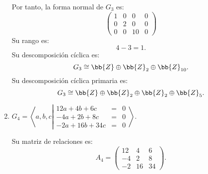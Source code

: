 \begin{ejercicio}
\begin{enumerate}
        Por tanto, la forma normal de $G_3$ es:
        \begin{equation*}
            \begin{pmatrix}
                1 & 0 & 0 & 0\\
                0 & 2 & 0 & 0 \\
                0 & 0 & 10 & 0
            \end{pmatrix}
        \end{equation*}
        Su rango es:
        \begin{equation*}
            4-3= 1.
        \end{equation*}
        Su descomposición cíclica es:
        \begin{equation*}
            G_3 \cong \bb{Z} \oplus \bb{Z}_2 \oplus \bb{Z}_{10}.
        \end{equation*}
        Su descomposición cíclica primaria es:
        \begin{equation*}
            G_3 \cong \bb{Z} \oplus \bb{Z}_2 \oplus \bb{Z}_2 \oplus \bb{Z}_5.
        \end{equation*}
        \item $G_4 = \left\langle a, b, c \left|
            \begin{array}{rcl}
                12a + 4b + 6c &=& 0 \\
                -4a + 2b + 8c &=& 0 \\
                -2a + 16b + 34c &=& 0
            \end{array}
        \right.\right\rangle$.

        Su matriz de relaciones es:
        \begin{equation*}
            A_4 = \begin{pmatrix}
                12 & 4 & 6 \\
                -4 & 2 & 8 \\
                -2 & 16 & 34
            \end{pmatrix}.
        \end{equation*}


\end{enumerate}
\end{ejercicio}
